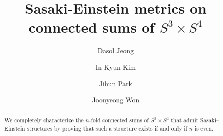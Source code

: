 \documentclass[12pt]{amsart}
\author{Dasol Jeong}
\author{In-Kyun Kim}
\author{Jihun Park}
\author{Joonyeong Won}
\title{Sasaki-Einstein metrics on connected sums of $S^3\times S^4$}
\theoremstyle{definition}
\theoremstyle{remark}
\begin{document}
\begin{abstract}
We completely characterize the $n$-fold connected sums of  $S^3\times S^4$  that admit Sasaki--Einstein structures by proving that such a structure exists if and only if $n$ is even.
\end{abstract}






\address{ \emph{Dasol Jeong}\newline \textnormal{Department of
Mathematics, POSTECH
\newline {} Cheongam-ro, Nam-gu, Pohang, Gyeongbuk, 37673, Korea \newline
Center for Geometry and Physics, Institute for Basic Science
 Jigok-ro127beon-gil,, Nam-gu, Pohang, Gyeongbuk, 37673, Korea \newline
\texttt{jdsleader@postech.ac.kr}}}



\address{ \emph{In-Kyun Kim}\newline \textnormal{
June E. Huh Center for Mathematical Challenges, KIAS Hoegiro, Dongdaemun-gu, Seoul 02455, Korea\newline
\texttt{soulcraw@gmail.com}}}


\address{ \emph{Jihun Park}\newline \textnormal{Center for Geometry and Physics, Institute for Basic Science
\newline {} Jigok-ro127beon-gil, Nam-gu, Pohang, Gyeongbuk, 37673, Korea \newline
Department of
Mathematics, POSTECH
 Cheongam-ro, Nam-gu, Pohang, Gyeongbuk,  37673, Korea \newline
\texttt{wlog@postech.ac.kr}}}




\address{ \emph{Joonyeong Won}\newline \textnormal{Department of Mathematics, Ewha Womans University Ewhayeodae-gil, Seodaemun-gu, Seoul,
03760, Korea. \newline
\texttt{leonwon@ewha.ac.kr}}}


\maketitle
\end{document}
